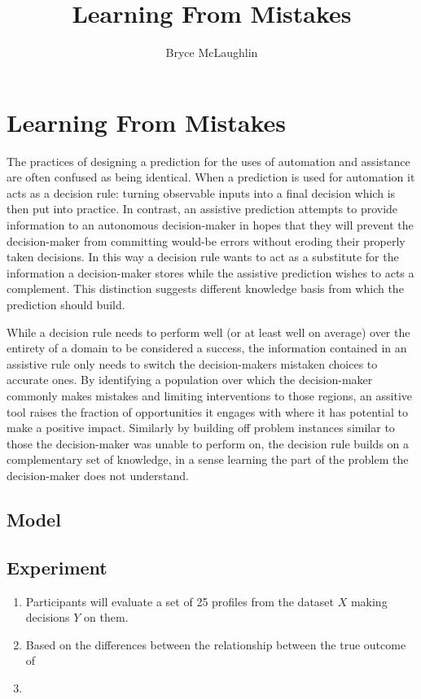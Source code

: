 \documentclass[10pt]{article}
\title{Learning From Mistakes}
\author{Bryce McLaughlin}
\begin{document}
\section*{Learning From Mistakes}

The practices of designing a prediction for the uses of automation and assistance are often confused as being identical. When a prediction is used for automation it acts as a decision rule: turning observable inputs into a final decision which is then put into practice. In contrast, an assistive prediction attempts to provide information to an autonomous decision-maker in hopes that they will prevent the decision-maker from committing would-be errors without eroding their properly taken decisions. In this way a decision rule wants to act as a substitute for the information a decision-maker stores while the assistive prediction wishes to acts a complement. This distinction suggests different knowledge basis from which the prediction should build.

While a decision rule needs to perform well (or at least well on average) over the entirety of a domain to be considered a success, the information contained in an assistive rule only needs to switch the decision-makers mistaken choices to accurate ones. By identifying a population over which the decision-maker commonly makes mistakes and limiting interventions to those regions, an assitive tool raises the fraction of opportunities it engages with where it has potential to make a positive impact. Similarly by building off problem instances similar to those the decision-maker was unable to perform on, the decision rule builds on a complementary set of knowledge, in a sense learning the part of the problem the decision-maker does not understand. 

\subsection*{Model}



\subsection*{Experiment}

\begin{enumerate}
	\item Participants will evaluate a set of 25 profiles from the dataset $X$ making decisions $Y$ on them.
	\item Based on the differences between the relationship between the true outcome of 
	\item
\end{enumerate}
\end{document}
